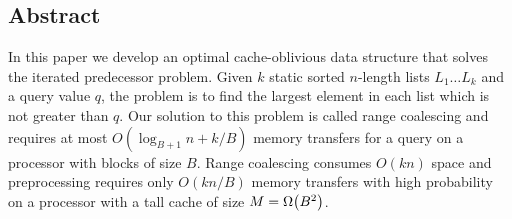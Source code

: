 \subsection*{Abstract}
In this paper we develop an optimal cache-oblivious data structure that solves the
iterated predecessor problem. Given $k$ static sorted $n$-length lists $L_1 \ldots L_k$
and a query value $q$, the  problem is to find the largest
element in each list which is not greater than $q$.  Our solution to this problem
is called range coalescing and requires at most $O(\log_{B+1} n + k/B)$ memory
transfers for a query on a processor with blocks of size $B$.
Range coalescing consumes $O(kn)$ space and preprocessing requires only $O(kn/B)$ 
memory transfers with high probability on a processor with a tall cache of 
size $M = \Omega \mathopen{}\left(B^2\right)\mathclose{}$.
